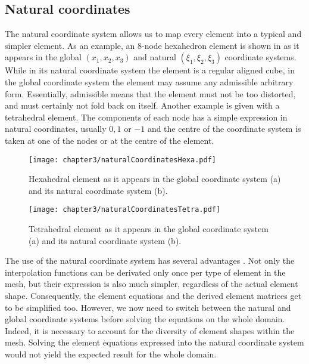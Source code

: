 	\subsection{Natural coordinates}
The natural coordinate system allows us to map every element into a typical and simpler element. As an example, an 8-node hexahedron element is shown in  as it appears in the global $(x_1, x_2, x_3)$ and natural $(\xi_1,\xi_2,\xi_3)$ coordinate systems. While in its natural coordinate system the element is a regular aligned cube, in the global coordinate system the element may assume any admissible arbitrary form. Essentially, admissible means that the element must not be too distorted, and must certainly not fold back on itself. Another example is given  with a tetrahedral element. The components of each node has a simple expression in natural coordinates, usually $0, 1$ or $-1$ and the centre of the coordinate system is taken at one of the nodes or at the centre of the element. 
%
\begin{figure}[h]
\begin{center}
\texttt{[image: chapter3/naturalCoordinatesHexa.pdf]}
\end{center}
\caption[Natural coordinates of a hexaedron]{Hexahedral element as it appears in the global coordinate system (a) and its natural coordinate system (b).}
\label{chap3:fig-naturalCoordinatesHexa}
\end{figure}
%
\begin{figure}[h]
\begin{center}
\texttt{[image: chapter3/naturalCoordinatesTetra.pdf]}
\end{center}
\caption[Natural coordinates of a tetrahedron]{Tetrahedral element as it appears in the global coordinate system (a) and its natural coordinate system (b).}
\label{chap3:fig-naturalCoordinatesTetra}
\end{figure}

The use of the natural coordinate system has several advantages \citep{Biswas76}. Not only the interpolation functions can be derivated only once per type of element in the mesh, but their expression is also much simpler, regardless of the actual element shape. Consequently, the element equations and the derived element matrices get to be simplified too. However, we now need to switch between the natural and global coordinate systems before solving the equations on the whole domain. Indeed, it is necessary to account for the diversity of element shapes within the mesh. Solving the element equations expressed into the natural coordinate system would not yield the expected result for the whole domain. 
	
